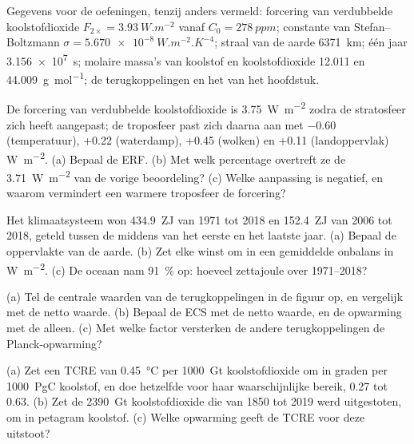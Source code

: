 Gegevens voor de oefeningen, tenzij anders vermeld: forcering van verdubbelde koolstofdioxide $F_{2\times} =
\qty{3.93}{W.m^{-2}}$ vanaf $C_0 = \qty{278}{ppm}$; constante van Stefan--Boltzmann $\sigma =
\qty{5.670e-8}{W.m^{-2}.K^{-4}}$; straal van de aarde \qty{6371}{km}; één jaar
\qty{3.156e7}{s}; molaire massa's van koolstof en koolstofdioxide 12.011 en \qty{44.009}{g.mol^{-1}};
de terugkoppelingen en het  van het hoofdstuk.

\begin{exercise}[$\star$]\label{exo:b2:anthropogenic-climate-change:1}
De forcering van verdubbelde koolstofdioxide is \qty{3.75}{W.m^{-2}} zodra de stratosfeer zich heeft aangepast;
de troposfeer past zich daarna aan met $-0.60$ (temperatuur), +0.22 (waterdamp), +0.45 (wolken) en
+0.11 (landoppervlak) \unit{W.m^{-2}}. (a) Bepaal de ERF. (b) Met welk percentage overtreft ze de
\qty{3.71}{W.m^{-2}} van de vorige beoordeling? (c) Welke aanpassing is negatief, en waarom vermindert een warmere
troposfeer de forcering?
\end{exercise}

\begin{exercise}[$\star$]\label{exo:b2:anthropogenic-climate-change:2}
Het klimaatsysteem won \qty{434.9}{ZJ} van 1971 tot 2018 en \qty{152.4}{ZJ} van 2006 tot 2018,
geteld tussen de middens van het eerste en het laatste jaar. (a) Bepaal de oppervlakte van de aarde.
(b) Zet elke winst om in een gemiddelde onbalans in \unit{W.m^{-2}}. (c) De oceaan nam
\qty{91}{\percent} op: hoeveel zettajoule over 1971--2018?
\end{exercise}

\begin{exercise}[$\star$]\label{exo:b2:anthropogenic-climate-change:3}
(a) Tel de centrale waarden van de terugkoppelingen in de figuur op, en vergelijk met de netto waarde. (b) Bepaal
de ECS met de netto waarde, en de opwarming met de  alleen. (c) Met welke factor versterken
de andere terugkoppelingen de Planck-opwarming?
\end{exercise}

\begin{exercise}[$\star$]\label{exo:b2:anthropogenic-climate-change:4}
(a) Zet een TCRE van \qty{0.45}{\celsius} per \qty{1000}{Gt} koolstofdioxide om in graden per
\qty{1000}{PgC} koolstof, en doe hetzelfde voor haar waarschijnlijke bereik, 0.27 tot 0.63. (b) Zet de
\qty{2390}{Gt} koolstofdioxide die van 1850 tot 2019 werd uitgestoten, om in petagram koolstof. (c) Welke
opwarming geeft de TCRE voor deze uitstoot?
\end{exercise}

